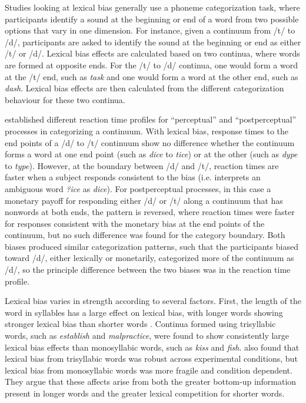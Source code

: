 Studies looking at lexical bias generally use a phoneme categorization task, where participants identify a sound at the beginning or end of a word from two possible options that vary in one dimension.  
For instance, given a continuum from /t/ to /d/, participants are asked to identify the sound at the beginning or end as either /t/ or /d/. 
Lexical bias effects are calculated based on two continua, where words are formed at opposite ends. 
For the /t/ to /d/ continua, one would form a word at the /t/ end, such as \emph{task} and one would form a word at the other end, such as \emph{dash}.  
Lexical bias effects are then calculated from the different categorization behaviour for these two continua.

\citet{Connine1987a} established different reaction time profiles for ``perceptual'' and ``postperceptual'' processes in categorizing a continuum.  With lexical bias, response times to the end points of a /d/ to /t/ continuum show no difference whether the continuum forms a word at one end point (such as \emph{dice} to \emph{tice}) or at the other (such as \emph{dype} to \emph{type}).  However, at the boundary between /d/ and /t/, reaction times are faster when a subject responds consistent to the bias (i.e. interprets an ambiguous word \emph{?ice} as \emph{dice}).  For postperceptual processes, in this case a monetary payoff for responding either /d/ or /t/ along a continuum that has nonwords at both ends, the pattern is reversed, where reaction times were faster for responses consistent with the monetary bias at the end points of the continuum, but no such difference was found for the category boundary.  Both biases produced similar categorization patterns, such that the participants biased toward /d/, either lexically or monetarily, categorized more of the continuum as /d/, so the principle difference between the two biases was in the reaction time profile.

Lexical bias varies in strength according to several factors.  
First, the length of the word in syllables has a large effect on lexical bias, with longer words showing stronger lexical bias than shorter words \citep{Pitt2006}.  
Continua formed using trisyllabic words, such as \emph{establish} and \emph{malpractice}, were found to show consistently large lexical bias effects than monosyllabic words, such as \emph{kiss} and \emph{fish}.  
\citet{Pitt2006} also found that lexical bias from trisyllabic words was robust across experimental conditions, but lexical bias from monosyllabic words was more fragile and condition dependent.  They argue that these affects arise from both the greater bottom-up information present in longer words and the greater lexical competition for shorter words.

